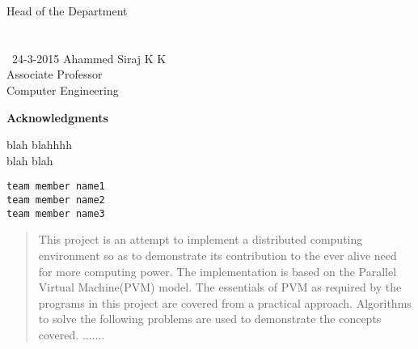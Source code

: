 \documentclass[11pt]{report}
\begin{document}
\begin{titlepage}
\begin{tabbing}
			\>Head of the Department \\
\\
\\
\ 24-3-2015 %
\> Ahammed Siraj K K\\
\> Associate Professor\\
\> Computer  Engineering\\
\end{tabbing}
\end{titlepage}
  
 

\begin{titlepage}
\vspace{.25in}	
\begin{center}
\Large\textbf{{Acknowledgments}}\\
\end{center}
\normalsize
\vspace{.25in}

\vspace{.25in}
blah blahhhh\\

blah blah\\


\begin{flushleft}
\small{\texttt{team member name1}}\\
\small{\texttt{team member name2}}\\
\small{\texttt{team member name3}}
\end{flushleft}
 
\end{titlepage}

 
\begin{abstract}

This project is an attempt to implement a distributed computing environment so 
as to demonstrate its contribution to the ever alive need for more 
computing power. The implementation is based on the Parallel Virtual Machine(PVM) 
 model.  The essentials of PVM as required by the programs in this project are 
covered from a practical approach. Algorithms to solve the following problems are 
used to demonstrate the concepts covered. .......

\end{abstract}
\end{document}
